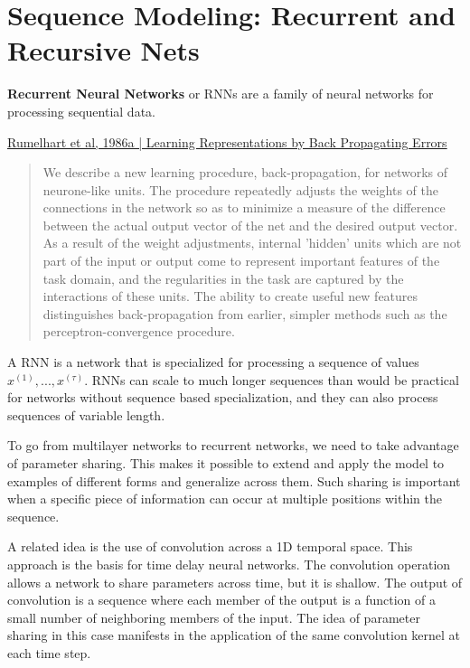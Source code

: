 \documentclass[letterpaper, 12pt]{report}
\begin{document}

\chapter{Sequence Modeling: Recurrent and Recursive Nets}

\textbf{Recurrent Neural Networks} or RNNs are a family of neural networks for processing sequential data. 

\href{https://www.iro.umontreal.ca/~vincentp/ift3395/lectures/backprop_old.pdf}{Rumelhart et al, 1986a | Learning Representations by Back Propagating Errors}

\begin{quote}
  We describe a new learning procedure, back-propagation, for networks
  of neurone-like units. The procedure repeatedly adjusts the weights
  of the connections in the network so as to minimize a measure of the
  difference between the actual output vector of the net and the
  desired output vector. As a result of the weight adjustments,
  internal 'hidden' units which are not part of the input or output
  come to represent important features of the task domain, and the
  regularities in the task are captured by the interactions of these
  units. The ability to create useful new features distinguishes
  back-propagation from earlier, simpler methods such as the
  perceptron-convergence procedure.
\end{quote}

A RNN is a network that is specialized for processing a sequence of values $x^{(1)}, ..., x^{(\tau)}$. RNNs can scale to much longer sequences than would be practical for networks without sequence based specialization, and they can also process sequences of variable length. 

To go from multilayer networks to recurrent networks, we need to take advantage of parameter sharing. This makes it possible to extend and apply the model to examples of different forms and generalize across them. Such sharing is important when a specific piece of information can occur at multiple positions within the sequence.

A related idea is the use of convolution across a 1D temporal space. This approach is the basis for time delay neural networks. The convolution operation allows a network to share parameters across time, but it is shallow. The output of convolution is a sequence where each member of the output is a function of a small number of neighboring members of the input. The idea of parameter sharing in this case manifests in the application of the same convolution kernel at each time step.
\end{document}
